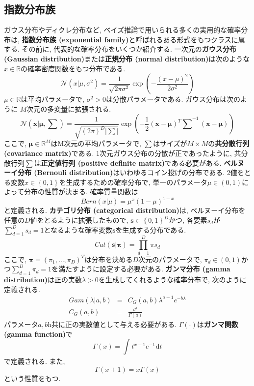 \documentclass[twocolumn]{jarticle}
\begin{document}
\subsection{指数分布族}
ガウス分布やディクレ分布など, ベイズ推論で用いられる多くの実用的な確率分布は, {\bf 指数分布族 (exponential family)}と呼ばれるある形式をもつクラスに属する. その前に, 代表的な確率分布をいくつか紹介する.
一次元の{\bf ガウス分布 (Gaussian distribution)}または{\bf 正規分布 (normal distribution)}は次のような${x \in \mathbb{R}}$の確率密度関数をもつ分布である.
\begin{equation}
  \mathcal{N} (x|\mu, \sigma^2) = \frac{1}{\sqrt{2\pi \sigma ^2}} \exp (- \frac{(x - \mu)^2}{2\sigma^2})
\end{equation}
${\mu \in \mathbb{R}}$は平均パラメータで, ${\sigma^2 > 0}$は分散パラメータである. ガウス分布は次のように ${M}$次元の多変量に拡張される.
\begin{equation}
  \mathcal{N} (\bm {x|\mu, \sum }) = \frac{1}{\sqrt{(2\pi)^D \left\lvert \sum\right\rvert }} \exp \left(- \frac{1}{2} (\bm {x - \mu})^T {\sum_{}^{}}^{-1} (\bm {x - \mu}) \right)
\end{equation}
ここで, ${\bm {\mu} \in \mathbb{R}^M}$はM次元の平均パラメータで, ${\sum}$はサイズが${M \times M}$の{\bf 共分散行列 (covariance matrix)}である. 1次元ガウス分布の分散が正であったように, 共分散行列${\sum}$は{\bf 正定値行列 (positive definite matrix)}である必要がある.
{\bf ベルヌーイ分布 (Bernouli distribution)}はいわゆるコイン投げの分布である. 2値をとる変数${x \in \left\{0, 1\right\}}$を生成するための確率分布で, 単一のパラメータ${\mu \in (0, 1)}$によって分布の性質が決まる. 確率質量関数は
\begin{equation}
  Bern(x|\mu) = \mu^x(1 - \mu)^{1-x}
\end{equation}
と定義される.
{\bf カテゴリ分布 (categorical distribution)}は, ベルヌーイ分布を任意の${D}$値をとるように拡張したもので, ${\bm {s} \in \left\{0, 1\right\}^D}$かつ, 各要素${s_d}$が${\sum_{d=1}^D s_d = 1}$となるような確率変数${\bm {s}}$を生成する分布である.
\begin{equation}
  Cat (\bm {s} | \bm {\pi}) = \prod_{d=1}^D \pi{s_d}
\end{equation}
ここで, ${\bm {\pi} = (\pi_1, \ldots, \pi_D)^T}$は分布を決める${D}$次元のパラメータで, ${\pi_d \in (0, 1)}$かつ${\sum_{d=1}^D \pi_d = 1}$を満たすように設定する必要がある. {\bf ガンマ分布 (gamma distribution)}は正の実数${\lambda > 0}$を生成してくれるような確率分布で, 次のように定義される.
\begin{eqnarray}
  Gam(\lambda|a, b) &=& C_G(a, b)\lambda^{a-1}e^{-b\lambda} \\
  C_G (a, b) &=& \frac{{b^a}}{\Gamma (a)}
\end{eqnarray}
パラメータ${a, b}$h共に正の実数値として与える必要がある. ${\Gamma(\cdot )}$は{\bf ガンマ関数 (gamma function)}で
\begin{equation}
  \Gamma (x) = \int_{}^{} t^{x-1}e^{-t} \,\mathrm{d}t
\end{equation}
で定義される. また,
\begin{equation}
  \Gamma (x + 1) = x\Gamma(x)
\end{equation}
という性質をもつ.
\end{document}
